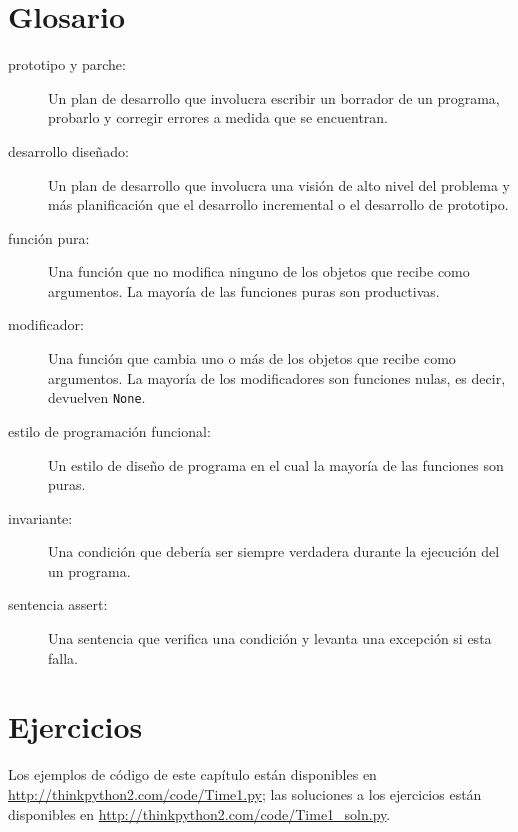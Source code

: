 \documentclass[10pt]{book}
\begin{document}
\section{Glosario}

\begin{description}

\item[prototipo y parche:] Un plan de desarrollo que involucra
escribir un borrador de un programa, probarlo y corregir errores a medida que
se encuentran.

\item[desarrollo diseñado:] Un plan de desarrollo que involucra una
visión de alto nivel del problema y más planificación que el desarrollo
incremental o el desarrollo de prototipo.

\item[función pura:] Una función que no modifica ninguno de los objetos que
recibe como argumentos.  La mayoría de las funciones puras son productivas.

\item[modificador:] Una función que cambia uno o más de los objetos que
  recibe como argumentos.  La mayoría de los modificadores son funciones nulas, es decir,
  devuelven {\tt None}.  

\item[estilo de programación funcional:] Un estilo de diseño de programa en el cual la
mayoría de las funciones son puras.

\item[invariante:] Una condición que debería ser siempre verdadera durante la
ejecución del un programa.

\item[sentencia assert:] Una sentencia que verifica una condición y levanta
una excepción si esta falla.

\end{description}


\section{Ejercicios}

Los ejemplos de código de este capítulo están disponibles en
\url{http://thinkpython2.com/code/Time1.py}; las soluciones a los
ejercicios están disponibles en \url{http://thinkpython2.com/code/Time1_soln.py}.
\end{document}
